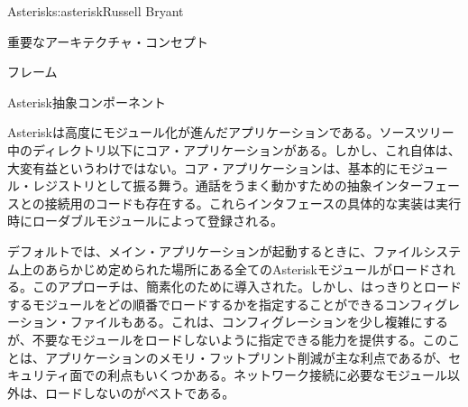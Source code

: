 \begin{aosachapter}{Asterisk}{s:asterisk}{Russell Bryant}
\begin{aosasect1}{重要なアーキテクチャ・コンセプト}
\begin{aosasect2}{フレーム}
\end{aosasect2}

\end{aosasect1}

\begin{aosasect1}{Asterisk抽象コンポーネント}

Asteriskは高度にモジュール化が進んだアプリケーションである。ソースツリー中のディレクトリ以下にコア・アプリケーションがある。しかし、これ自体は、大変有益というわけではない。コア・アプリケーションは、基本的にモジュール・レジストリとして振る舞う。通話をうまく動かすための抽象インターフェースとの接続用のコードも存在する。これらインタフェースの具体的な実装は実行時にローダブルモジュールによって登録される。

デフォルトでは、メイン・アプリケーションが起動するときに、ファイルシステム上のあらかじめ定められた場所にある全てのAsteriskモジュールがロードされる。このアプローチは、簡素化のために導入された。しかし、はっきりとロードするモジュールをどの順番でロードするかを指定することができるコンフィグレーション・ファイルもある。これは、コンフィグレーションを少し複雑にするが、不要なモジュールをロードしないように指定できる能力を提供する。このことは、アプリケーションのメモリ・フットプリント削減が主な利点であるが、セキュリティ面での利点もいくつかある。ネットワーク接続に必要なモジュール以外は、ロードしないのがベストである。


\end{aosasect1}
\end{aosachapter}
